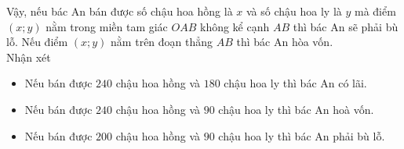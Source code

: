 \begin{bt}
{{}
		\noindent
		Vậy, nếu bác An bán được số chậu hoa hồng là $x$ và số chậu hoa ly là $y$ mà điểm $(x; y)$ nằm trong miền tam giác $OAB$ không kể
		cạnh $AB$ thì bác An sẽ phải bù lỗ.
		Nếu điểm $(x; y)$ nằm trên đoạn thẳng $AB$ thì bác An hòa vốn.\\
		Nhận xét
		\begin{itemize}
			\item  Nếu bán được $240$ chậu hoa hồng và $180$ chậu hoa ly thì bác An có lãi.
			\item  Nếu bán được $240$ chậu hoa hồng và $90$ chậu hoa ly thì bác An hoà vốn.
			\item Nếu bán được $200$ chậu hoa hồng và $90$ chậu hoa ly thì bác An phải bù lỗ.
		\end{itemize}
	}
\end{bt}

